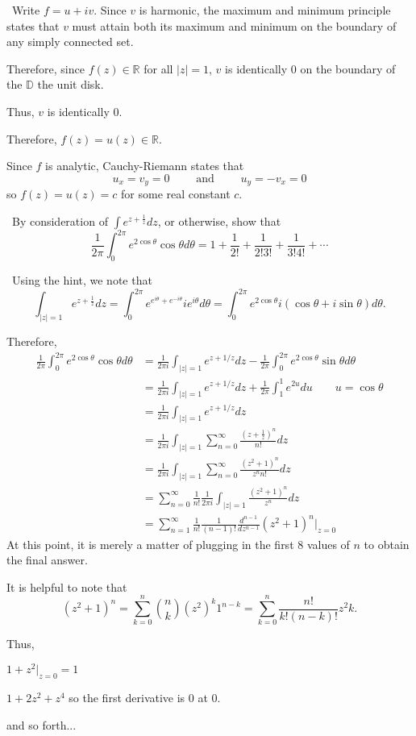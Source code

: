 \documentclass[12pt]{Homework}
\begin{document}
\begin{solution}$\,$
Write $f=u+iv$. Since $v$ is harmonic, the maximum and minimum principle states that $v$ must attain both its maximum and minimum on the boundary of any simply connected set. 

Therefore, since $f(z)\in\mathbb{R}$ for all $|z|=1$, $v$ is identically $0$ on the boundary of the $\mathbb{D}$ the unit disk.

Thus, $v$ is identically $0$. 

Therefore, $f(z)=u(z)\in\mathbb{R}$.

Since $f$ is analytic, Cauchy-Riemann states that $$u_x=v_y=0\qquad\text{ and }\qquad u_y=-v_x=0$$ so $f(z)=u(z)=c$ for some real constant $c$. 
\end{solution}
\newpage





\begin{problem} $\,$
By consideration of $\int e^{z+\frac{1}{z}}dz$, or otherwise, show that $$\frac{1}{2\pi}\int_0^{2\pi}e^{2\cos\theta}\cos\theta d\theta=1+\frac{1}{2!}+\frac{1}{2!3!}+\frac{1}{3!4!}+\cdots$$
\end{problem}


\begin{solution}$\,$
Using the hint, we note that $$\int_{|z|=1}e^{z+\frac{1}{z}}dz=\int_0^{2\pi}e^{e^{i\theta}+e^{-i\theta}}ie^{i\theta}d\theta=\int_0^{2\pi}e^{2\cos\theta}i(\cos\theta+i\sin\theta)d\theta.$$

Therefore, \begin{align*}
  \frac{1}{2\pi}\int_0^{2\pi}e^{2\cos\theta}\cos\theta d\theta&=\frac{1}{2\pi i}\int_{|z|=1}e^{z+1/z}dz-\frac{1}{2\pi}\int_0^{2\pi}e^{2\cos\theta}\sin\theta d\theta\\
  &=\frac{1}{2\pi i}\int_{|z|=1}e^{z+1/z}dz+\frac{1}{2\pi}\int_1^1e^{2u}du\qquad u=\cos\theta\\
  &=\frac{1}{2\pi i}\int_{|z|=1}e^{z+1/z}dz\\
  &=\frac{1}{2\pi i}\int_{|z|=1}\sum_{n=0}^\infty\frac{\left(z+\frac{1}{z}\right)^n}{n!}dz\\
  &=\frac{1}{2\pi i}\int_{|z|=1}\sum_{n=0}^\infty\frac{(z^2+1)^n}{z^nn!}dz\\
  &=\sum_{n=0}^\infty\frac{1}{n!}\frac{1}{2\pi i}\int_{|z|=1}\frac{(z^2+1)^n}{z^n}dz\\
  &=\sum_{n=1}^\infty\frac{1}{n!}\frac{1}{(n-1)!}\frac{d^{n-1}}{dz^{n-1}}(z^2+1)^n\big|_{z=0}
\end{align*}
At this point, it is merely a matter of plugging in the first $8$ values of $n$ to obtain the final answer. 

It is helpful to note that $$(z^2+1)^n=\sum_{k=0}^n\binom{n}{k}(z^2)^k1^{n-k}=\sum_{k=0}^n\frac{n!}{k!(n-k)!}z^2k.$$

Thus,

 $1+z^2\big|_{z=0}=1$

 $1+2z^2+z^4$ so the first derivative is $0$ at $0$.

and so forth...
\end{solution}
\end{document}
